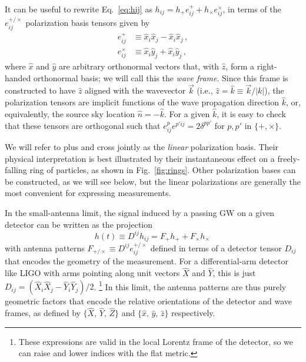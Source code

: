 \documentclass[aps,prd,twocolumn,superscriptaddress,preprintnumbers,floatfix,nofootinbib]{revtex4-2}
\newcommand{\beq}{\begin{equation}}
\newcommand{\eeq}{\end{equation}}
\newcommand*{\eq}[1]{Eq.~\eqref{eq:#1}}
\begin{document}
It can be useful to rewrite \eq{hij} as $h_{ij} = h_+ e^+_{ij} + h_\times e^\times_{ij}$, in terms of the $e^{+/\times}_{ij}$ polarization basis tensors given by
\begin{subequations} \label{eq:lin}
\begin{align}
e^+_{ij} &\equiv \hat{x}_i \hat{x}_j - \hat{x}_i \hat{x}_j \, ,\\
e^\times_{ij} &\equiv \hat{x}_i \hat{y}_j + \hat{x}_i \hat{y}_j\, ,
\end{align}
\end{subequations}
where $\hat{x}$ and $\hat{y}$ are arbitrary orthonormal vectors that, with $\hat{z}$, form a right-handed orthonormal basis; we will call this the \emph{wave frame}.
Since this frame is constructed to have $\hat{z}$ aligned with the wavevector $\vec{k}$ (i.e., $\hat{z} = \hat{k} \equiv \vec{k}/|k|$), the polarization tensors are implicit functions of the wave propagation direction $\hat{k}$, or, equivalently, the source sky location $\hat{n} = -\hat{k}$.
For a given $\hat{k}$, it is easy to check that these tensors are orthogonal such that $e^p_{ij} e^{p'ij}=2\delta^{pp'}$ for $p,p'$ in $\{+,\times\}$.

We will refer to plus and cross jointly as the \emph{linear} polarization basis.
Their physical interpretation is best illustrated by their instantaneous effect on a freely-falling ring of particles, as shown in Fig.~\ref{fig:rings}.
Other polarization bases can be constructed, as we will see below, but the linear polarizations are generally the most convenient for expressing measurements.

In the small-antenna limit, the signal induced by a passing GW on a given detector can be written as the projection
\beq \label{eq:h}
h(t) \equiv D^{ij} h_{ij} = F_+ h_+ + F_\times h_\times\, 
\eeq
with antenna patterns $F_{+/\times} \equiv D^{ij} e^{+/\times}_{ij}$ defined in terms of a detector tensor $D_{ij}$ that encodes the geometry of the measurement.
For a differential-arm detector like LIGO with arms pointing along unit vectors $\hat{X}$ and $\hat{Y}$, this is just $D_{ij} = (\hat{X}_i \hat{X}_j - \hat{Y}_i \hat{Y}_j)/2$.%
\footnote{These expressions are valid in the local Lorentz frame of the detector, so we can raise and lower indices with the flat metric.}
In this limit, the antenna patterns are thus purely geometric factors that encode the relative orientations of the detector and wave frames, as defined by $\{\hat{X},\, \hat{Y},\, \hat{Z}\}$ and $\{\hat{x},\, \hat{y},\, \hat{z}\}$ respectively.
\end{document}
